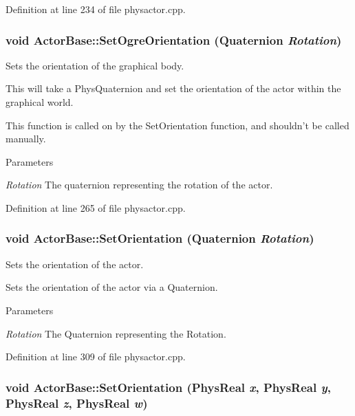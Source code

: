 Definition at line 234 of file physactor.cpp.

\hypertarget{classActorBase_ad13a4ba6d349dfab4965e58b8335d519}{
\subsubsection[{SetOgreOrientation}]{\setlength{\rightskip}{0pt plus 5cm}void ActorBase::SetOgreOrientation ({\bf Quaternion} {\em Rotation})}}
\label{dd/d7b/classActorBase_ad13a4ba6d349dfab4965e58b8335d519}


Sets the orientation of the graphical body. 

This will take a PhysQuaternion and set the orientation of the actor within the graphical world. \par
 This function is called on by the SetOrientation function, and shouldn't be called manually. 
\begin{DoxyParams}{Parameters}
\item[{\em Rotation}]The quaternion representing the rotation of the actor. \end{DoxyParams}


Definition at line 265 of file physactor.cpp.

\hypertarget{classActorBase_a66429021cfc19b32cd0f645955e20584}{
\subsubsection[{SetOrientation}]{\setlength{\rightskip}{0pt plus 5cm}void ActorBase::SetOrientation ({\bf Quaternion} {\em Rotation})}}
\label{dd/d7b/classActorBase_a66429021cfc19b32cd0f645955e20584}


Sets the orientation of the actor. 

Sets the orientation of the actor via a Quaternion. 
\begin{DoxyParams}{Parameters}
\item[{\em Rotation}]The Quaternion representing the Rotation. \end{DoxyParams}


Definition at line 309 of file physactor.cpp.

\hypertarget{classActorBase_a9777506815a9840552b30c65d5d70f8d}{
\subsubsection[{SetOrientation}]{\setlength{\rightskip}{0pt plus 5cm}void ActorBase::SetOrientation (PhysReal {\em x}, \/  PhysReal {\em y}, \/  PhysReal {\em z}, \/  PhysReal {\em w})}}
\label{dd/d7b/classActorBase_a9777506815a9840552b30c65d5d70f8d}


